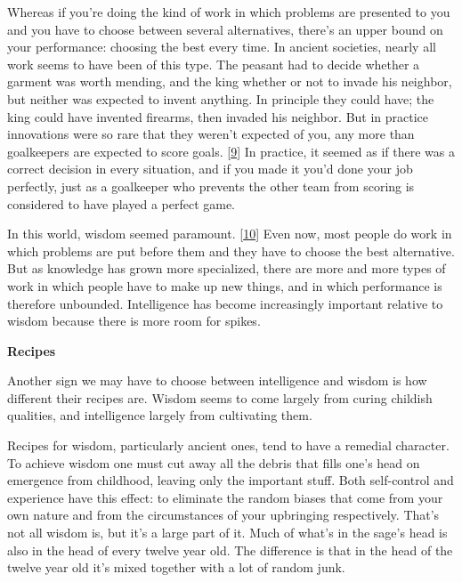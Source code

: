 Whereas
                  if you're doing the kind of work in which problems are
                  presented to you and you have to choose between several
                  alternatives, there's an upper bound on your performance:
                  choosing the best every time. In ancient societies, nearly all
                  work seems to have been of this type. The peasant had to
                  decide whether a garment was worth mending, and the king
                  whether or not to invade his neighbor, but neither was
                  expected to invent anything. In principle they could have; the
                  king could have invented firearms, then invaded his neighbor.
                  But in practice innovations were so rare that they weren't
                  expected of you, any more than goalkeepers are expected to
                  score goals.
                  [\href{\#f9n}{9}]
                  In practice, it seemed as if there was a correct decision in
                  every situation, and if you made it you'd done your job
                  perfectly, just as a goalkeeper who prevents the other team
                  from scoring is considered to have played a perfect game.

In
                  this world, wisdom seemed paramount.
                  [\href{\#f10n}{10}]
                  Even now, most people do work in which problems are put before
                  them and they have to choose the best alternative. But as
                  knowledge has grown more specialized, there are more and more
                  types of work in which people have to make up new things, and
                  in which performance is therefore unbounded. Intelligence has
                  become increasingly important relative to wisdom because there
                  is more room for spikes.

\textbf{Recipes}

Another sign we may have to choose between
                  intelligence and wisdom is how different their recipes are.
                  Wisdom seems to come largely from curing childish qualities,
                  and intelligence largely from cultivating them.

Recipes
                  for wisdom, particularly ancient ones, tend to have a remedial
                  character. To achieve wisdom one must cut away all the debris
                  that fills one's head on emergence from childhood, leaving
                  only the important stuff. Both self-control and experience
                  have this effect: to eliminate the random biases that come
                  from your own nature and from the circumstances of your
                  upbringing respectively. That's not all wisdom is, but it's a
                  large part of it. Much of what's in the sage's head is also in
                  the head of every twelve year old. The difference is that in
                  the head of the twelve year old it's mixed together with a lot
                  of random junk.

